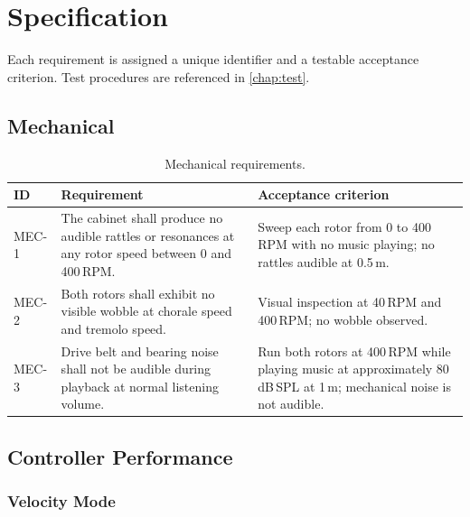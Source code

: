 
\chapter{Specification}

Each requirement is assigned a unique identifier and a testable acceptance criterion.
Test procedures are referenced in \autoref{chap:test}.

\section{Mechanical}

\begin{table}[H]
	\centering
	\begin{tabular}{p{1.2cm} p{5.5cm} p{6cm}}
		\toprule
		\textbf{ID} & \textbf{Requirement}                                                                                  & \textbf{Acceptance criterion} \\
		\midrule
		MEC-1       & The cabinet shall produce no audible rattles or resonances at any rotor speed between 0 and 400\,RPM. &
		Sweep each rotor from 0 to 400\,RPM with no music playing; no rattles audible at 0.5\,m.                                                            \\[4pt]
		MEC-2       & Both rotors shall exhibit no visible wobble at chorale speed and tremolo speed.                       &
		Visual inspection at 40\,RPM and 400\,RPM; no wobble observed.                                                                                      \\[4pt]
		MEC-3       & Drive belt and bearing noise shall not be audible during playback at normal listening volume.         &
		Run both rotors at 400\,RPM while playing music at approximately 80\,dB\,SPL at 1\,m; mechanical noise is not audible.                              \\
		\bottomrule
	\end{tabular}
	\caption{Mechanical requirements.}
	\label{tab:spec-mechanical}
\end{table}

\section{Controller Performance}

\subsection{Velocity Mode}

